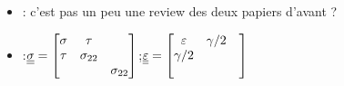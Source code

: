 \begin{itemize}
\item \cite{Ting73}: c'est pas un peu une review des deux papiers d'avant ?
\item \cite{Li_planeStress_EP}:${\underline{\underline{\sigma}}}=\left[\begin{matrix}\sigma & \tau & \\ \tau & \sigma_{22} & \\ & & \sigma_{22}\end{matrix}\right]$;${\underline{\underline{\varepsilon}}}=\left[\begin{matrix}\varepsilon & \gamma/2 & \\ \gamma/2 &  & \\ & & \end{matrix}\right]$
\end{itemize}


